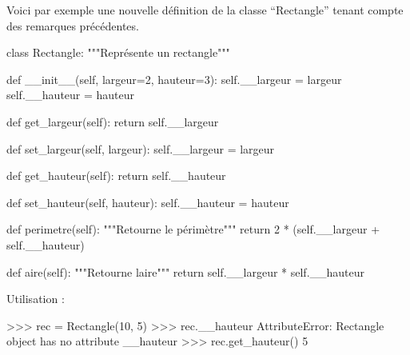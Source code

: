\documentclass[
  letterpaper,
  DIV=11,
  numbers=noendperiod]{scrartcl}
\newenvironment{Shaded}{\begin{snugshade}}{\end{snugshade}}
\newcommand{\BuiltInTok}[1]{\textcolor[rgb]{0.00,0.23,0.31}{#1}}
\newcommand{\CommentTok}[1]{\textcolor[rgb]{0.37,0.37,0.37}{#1}}
\newcommand{\ControlFlowTok}[1]{\textcolor[rgb]{0.00,0.23,0.31}{#1}}
\newcommand{\DecValTok}[1]{\textcolor[rgb]{0.68,0.00,0.00}{#1}}
\newcommand{\FunctionTok}[1]{\textcolor[rgb]{0.28,0.35,0.67}{#1}}
\newcommand{\KeywordTok}[1]{\textcolor[rgb]{0.00,0.23,0.31}{#1}}
\newcommand{\NormalTok}[1]{\textcolor[rgb]{0.00,0.23,0.31}{#1}}
\newcommand{\OperatorTok}[1]{\textcolor[rgb]{0.37,0.37,0.37}{#1}}
\newcommand{\PreprocessorTok}[1]{\textcolor[rgb]{0.68,0.00,0.00}{#1}}
\newcommand{\StringTok}[1]{\textcolor[rgb]{0.13,0.47,0.30}{#1}}
\newcommand{\VariableTok}[1]{\textcolor[rgb]{0.07,0.07,0.07}{#1}}
\begin{document}
Voici par exemple une nouvelle définition de la classe ``Rectangle''
tenant compte des remarques précédentes.

\begin{Shaded}
\begin{Highlighting}[]
\KeywordTok{class}\NormalTok{ Rectangle:}
    \CommentTok{"""Représente un rectangle"""}

    \KeywordTok{def} \FunctionTok{\_\_init\_\_}\NormalTok{(}\VariableTok{self}\NormalTok{, largeur}\OperatorTok{=}\DecValTok{2}\NormalTok{, hauteur}\OperatorTok{=}\DecValTok{3}\NormalTok{):}
        \VariableTok{self}\NormalTok{.\_\_largeur }\OperatorTok{=}\NormalTok{ largeur}
        \VariableTok{self}\NormalTok{.\_\_hauteur }\OperatorTok{=}\NormalTok{ hauteur}

    \KeywordTok{def}\NormalTok{ get\_largeur(}\VariableTok{self}\NormalTok{):}
        \ControlFlowTok{return} \VariableTok{self}\NormalTok{.\_\_largeur}

    \KeywordTok{def}\NormalTok{ set\_largeur(}\VariableTok{self}\NormalTok{, largeur):}
        \VariableTok{self}\NormalTok{.\_\_largeur }\OperatorTok{=}\NormalTok{ largeur}

    \KeywordTok{def}\NormalTok{ get\_hauteur(}\VariableTok{self}\NormalTok{):}
        \ControlFlowTok{return} \VariableTok{self}\NormalTok{.\_\_hauteur}

    \KeywordTok{def}\NormalTok{ set\_hauteur(}\VariableTok{self}\NormalTok{, hauteur):}
        \VariableTok{self}\NormalTok{.\_\_hauteur }\OperatorTok{=}\NormalTok{ hauteur}

    \KeywordTok{def}\NormalTok{ perimetre(}\VariableTok{self}\NormalTok{):}
        \CommentTok{"""Retourne le périmètre"""}
        \ControlFlowTok{return} \DecValTok{2} \OperatorTok{*}\NormalTok{ (}\VariableTok{self}\NormalTok{.\_\_largeur }\OperatorTok{+} \VariableTok{self}\NormalTok{.\_\_hauteur)}

    \KeywordTok{def}\NormalTok{ aire(}\VariableTok{self}\NormalTok{):}
        \CommentTok{"""Retourne l\textquotesingle{}aire"""}
        \ControlFlowTok{return} \VariableTok{self}\NormalTok{.\_\_largeur }\OperatorTok{*} \VariableTok{self}\NormalTok{.\_\_hauteur}
\end{Highlighting}
\end{Shaded}

Utilisation :

\begin{Shaded}
\begin{Highlighting}[]
\OperatorTok{\textgreater{}\textgreater{}\textgreater{}}\NormalTok{ rec }\OperatorTok{=}\NormalTok{ Rectangle(}\DecValTok{10}\NormalTok{, }\DecValTok{5}\NormalTok{)}
\OperatorTok{\textgreater{}\textgreater{}\textgreater{}}\NormalTok{ rec.\_\_hauteur}
\PreprocessorTok{AttributeError}\NormalTok{: }\StringTok{\textquotesingle{}Rectangle\textquotesingle{}} \BuiltInTok{object}\NormalTok{ has no attribute }\StringTok{\textquotesingle{}\_\_hauteur\textquotesingle{}}
\OperatorTok{\textgreater{}\textgreater{}\textgreater{}}\NormalTok{ rec.get\_hauteur()}
\DecValTok{5}
\end{Highlighting}
\end{Shaded}
\end{document}
